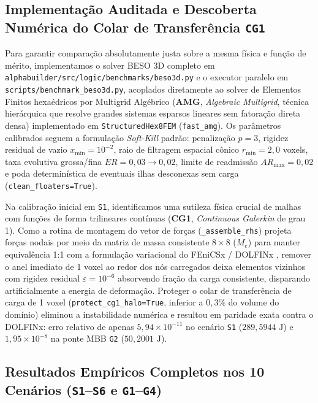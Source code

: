 \documentclass[11pt,a4paper]{article}
\begin{document}
\subsection{Implementação Auditada e Descoberta Numérica do Colar de Transferência \texttt{CG1}}

Para garantir comparação absolutamente justa sobre a mesma física e função de mérito, implementamos o solver BESO 3D completo em \texttt{alphabuilder/src/logic/benchmarks/beso3d.py} e o executor paralelo em \texttt{scripts/benchmark\_beso3d.py}, acoplados diretamente ao solver de Elementos Finitos hexaédricos por Multigrid Algébrico (\textbf{AMG}, \textit{Algebraic Multigrid}, técnica hierárquica que resolve grandes sistemas esparsos lineares sem fatoração direta densa) implementado em \texttt{StructuredHex8FEM} (\texttt{fast\_amg}). Os parâmetros calibrados seguem a formulação \textit{Soft-Kill} padrão: penalização $p = 3$, rigidez residual de vazio $x_{\min} = 10^{-2}$, raio de filtragem espacial cônico $r_{\min} = 2{,}0$ voxels, taxa evolutiva grossa/fina $ER = 0{,}03 \to 0{,}02$, limite de readmissão $AR_{\max} = 0{,}02$ e poda determinística de eventuais ilhas desconexas sem carga (\texttt{clean\_floaters=True}).

Na calibração inicial em \texttt{S1}, identificamos uma sutileza física crucial de malhas com funções de forma trilineares contínuas (\textbf{CG1}, \textit{Continuous Galerkin} de grau 1). Como a rotina de montagem do vetor de forças (\texttt{\_assemble\_rhs}) projeta forças nodais por meio da matriz de massa consistente $8\times 8$ ($M_e$) para manter equivalência 1:1 com a formulação variacional do FEniCSx / DOLFINx \cite{baratta2023dolfinx, ferrari2020new}, remover o anel imediato de 1 voxel ao redor dos nós carregados deixa elementos vizinhos com rigidez residual $\varepsilon = 10^{-6}$ absorvendo fração da carga consistente, disparando artificialmente a energia de deformação. Proteger o colar de transferência de carga de 1 voxel (\texttt{protect\_cg1\_halo=True}, inferior a $0{,}3\%$ do volume do domínio) eliminou a instabilidade numérica e resultou em paridade exata contra o DOLFINx: erro relativo de apenas $5{,}94 \times 10^{-11}$ no cenário \texttt{S1} ($289{,}5944\text{ J}$) e $1{,}95 \times 10^{-8}$ na ponte MBB \texttt{G2} ($50{,}2001\text{ J}$).

\subsection{Resultados Empíricos Completos nos 10 Cenários (\texttt{S1}--\texttt{S6} e \texttt{G1}--\texttt{G4})}
\end{document}
